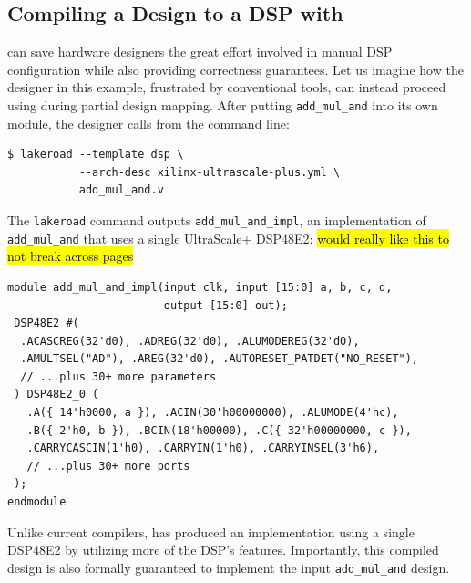 

  
\subsection{Compiling a Design to a DSP with \lr}
\label{sec:overview-part-2}

\lr can save hardware designers
  the great effort involved
  in manual DSP configuration
  while also providing correctness guarantees.
Let us imagine how the designer 
  in this example,
  frustrated by conventional tools,
  can instead proceed using \lr
  during partial design mapping.
After putting 
  \texttt{add\_mul\_and}
  into its own module,
  the designer calls
  \lr from the command line:
\begin{verbatim}
$ lakeroad --template dsp \
           --arch-desc xilinx-ultrascale-plus.yml \
           add_mul_and.v
\end{verbatim}
The \texttt{lakeroad} command outputs
  \texttt{add\_mul\_and\_impl},
  an implementation
  of \texttt{add\_mul\_and}
  that uses a single UltraScale+ DSP48E2:
\hl{would really like this to not break across pages}
\begin{verbatim}
module add_mul_and_impl(input clk, input [15:0] a, b, c, d,
                        output [15:0] out);
 DSP48E2 #(
  .ACASCREG(32'd0), .ADREG(32'd0), .ALUMODEREG(32'd0),
  .AMULTSEL("AD"), .AREG(32'd0), .AUTORESET_PATDET("NO_RESET"), 
  // ...plus 30+ more parameters
 ) DSP48E2_0 (
   .A({ 14'h0000, a }), .ACIN(30'h00000000), .ALUMODE(4'hc),
   .B({ 2'h0, b }), .BCIN(18'h00000), .C({ 32'h00000000, c }),
   .CARRYCASCIN(1'h0), .CARRYIN(1'h0), .CARRYINSEL(3'h6),
   // ...plus 30+ more ports
 );
endmodule
\end{verbatim}
%
Unlike current compilers,
  \lr has produced an implementation
  using a single DSP48E2
  by utilizing more of the DSP's features.
Importantly, this compiled design
  is also formally guaranteed
  to implement
  the input \texttt{add\_mul\_and}
  design.
  
